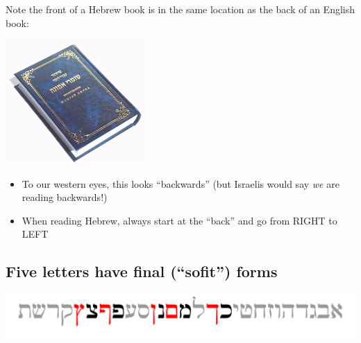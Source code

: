 \documentclass[
]{turabian-researchpaper}
\providecommand{\tightlist}{%
  \setlength{\itemsep}{0pt}\setlength{\parskip}{0pt}}
\begin{document}
Note the front of a Hebrew book is in the same location as the back of an English book:

\begin{center}\includegraphics[width=150pt]{images/hebrewbook} \end{center}

\begin{itemize}
\tightlist
\item
  To our western eyes, this looks ``backwards'' (but Israelis would say \emph{we} are reading backwards!)
\item
  When reading Hebrew, always start at the ``back'' and go from RIGHT to LEFT
\end{itemize}

\hypertarget{one_3}{%
\subsection{Five letters have final (``sofit'') forms}\label{one_3}}

\begin{center}\includegraphics[width=500pt]{images/kimnepatz} \end{center}
\end{document}

